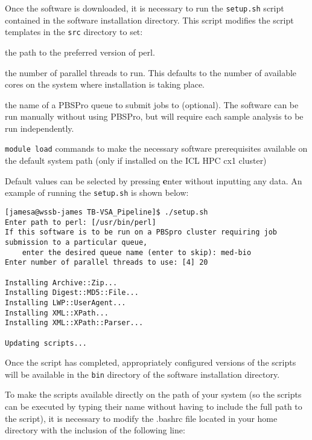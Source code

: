 \documentclass[a4paper,10pt,twoside]{article}
\newenvironment{tight_enumerate}{
\begin{enumerate}
  \setlength{\itemsep}{0pt}
  \setlength{\parskip}{0pt}
}{\end{enumerate}}
\begin{document}
Once the software is downloaded, it is necessary to run the {\tt setup.sh}
script contained in the software installation directory. This script modifies
the script templates in the {\tt src} directory to set:

\begin{tight_enumerate}
\item the path to the preferred version of perl. 

\item the number of parallel threads to run. This defaults to the number of available cores on the system where installation is taking place.

\item the name of a PBSPro queue to submit jobs to (optional). The software can
be run manually without using PBSPro, but will require each sample analysis to
be run independently.

\item {\tt module load} commands to make the necessary software prerequisites
available on the default system path (only if installed on the ICL HPC cx1
cluster) 
\end{tight_enumerate}

Default values can be selected by pressing {\textbf enter} without inputting
any data. An example of running the {\tt setup.sh} is shown below:

\begin{verbatim}
[jamesa@wssb-james TB-VSA_Pipeline]$ ./setup.sh 
Enter path to perl: [/usr/bin/perl] 
If this software is to be run on a PBSpro cluster requiring job submission to a particular queue, 
	enter the desired queue name (enter to skip): med-bio
Enter number of parallel threads to use: [4] 20

Installing Archive::Zip...
Installing Digest::MD5::File...
Installing LWP::UserAgent...
Installing XML::XPath...
Installing XML::XPath::Parser...

Updating scripts...
\end{verbatim}

Once the script has completed, appropriately configured versions of the scripts
will be available in the {\tt bin} directory of the software installation
directory. 

To make the scripts available directly on the path of your system (so the
scripts can be executed by typing their name without having to include the full
path to the script), it is necessary to modify the .bashrc file located in your
home directory with the inclusion of the following line:
\end{document}
